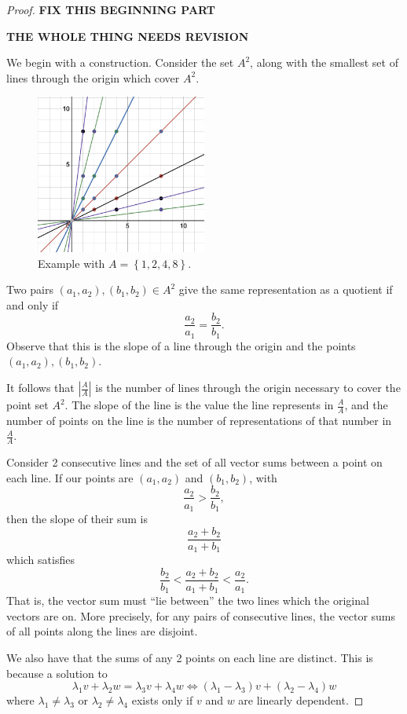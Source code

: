 \documentclass[12pt]{amsart}
\begin{document}
\begin{proof}

\textbf{FIX THIS BEGINNING PART}

\textbf{THE WHOLE THING NEEDS REVISION}

We begin with a construction. Consider the set \(A^{2}\), along with the smallest set of lines
through the origin which cover \(A^{2}\).

\begin{figure}[h]
    \centering
    \includegraphics[width=0.5\textwidth]{Sol1.png}
    \caption{Example with \(A = \left\{ 1,2,4,8 \right\} \).}
\end{figure}

Two pairs \((a_1,a_2),(b_1,b_2) \in A^{2}\) give the same representation as a quotient if
and only if
\[
    \frac{a_2}{a_1} = \frac{b_2}{b_1} 
.\]
Observe that this is the slope of a line through the origin and the points \((a_1,a_2), (b_1,b_2)\).

It follows that \(\left\lvert \frac{A}{A} \right\rvert \) is the number of lines through the origin
necessary to cover the point set \(A^{2}\). The slope of the line is the value the line represents 
in \(\frac{A}{A} \), and the number of points on the line is the number of representations of that number in \(\frac{A}{A} \).

Consider 2 consecutive lines and the set of all vector sums between a point on each line.
If our points are \(\left( a_1,a_2 \right)\) and \(\left( b_1,b_2 \right) \), with
\[
    \frac{a_2}{a_1} > \frac{b_2}{b_1}
,\]
then the slope of their sum is
\[
    \frac{a_2+b_2}{a_1+b_1}
\]
which satisfies
\[
    \frac{b_2}{b_1} < \frac{a_2+b_2}{a_1+b_1} < \frac{a_2}{a_1}
.\]
That is, the vector sum must ``lie between'' the two lines which the original vectors are on.
More precisely, for any pairs of consecutive lines, the vector sums of all points along the lines are disjoint.

We also have that the sums of any 2 points on each line are distinct. This is because a
solution to
\[
    \lambda_1 v + \lambda_2 w = \lambda_3 v + \lambda_4 w \iff \left( \lambda_1 - \lambda_3 \right) v + \left( \lambda_2 - \lambda_4 \right) w
\]
where \(\lambda_1 \neq \lambda_3\) or \(\lambda_2 \neq \lambda_4\) exists only if \(v\) and \(w\) are linearly dependent.


\end{proof}
\end{document}
